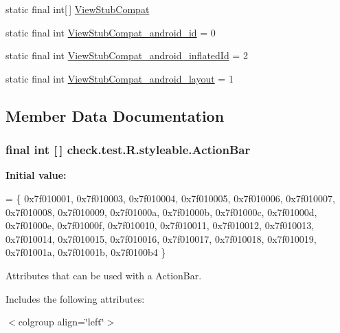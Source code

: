\begin{DoxyCompactItemize}
\item 
static final int\mbox{[}$\,$\mbox{]} \hyperlink{classcheck_1_1test_1_1_r_1_1styleable_adf691a9cd72c9028688f92bcb9b1c303}{View\+Stub\+Compat}
\item 
static final int \hyperlink{classcheck_1_1test_1_1_r_1_1styleable_af549e8eb71e8bfcf674efa7c9f7cd251}{View\+Stub\+Compat\+\_\+android\+\_\+id} = 0
\item 
static final int \hyperlink{classcheck_1_1test_1_1_r_1_1styleable_a7c6502320542baa7a355bd6d9665ff5f}{View\+Stub\+Compat\+\_\+android\+\_\+inflated\+Id} = 2
\item 
static final int \hyperlink{classcheck_1_1test_1_1_r_1_1styleable_ad1bcaf475dc40c26f77157642598f49c}{View\+Stub\+Compat\+\_\+android\+\_\+layout} = 1
\end{DoxyCompactItemize}


\subsection{Member Data Documentation}
\hypertarget{classcheck_1_1test_1_1_r_1_1styleable_ad0a4d403cb244ea4d22c6f6ebf2c2cdf}{}
\subsubsection[{Action\+Bar}]{\setlength{\rightskip}{0pt plus 5cm}final int \mbox{[}$\,$\mbox{]} check.\+test.\+R.\+styleable.\+Action\+Bar\hspace{0.3cm}{\ttfamily [static]}}\label{classcheck_1_1test_1_1_r_1_1styleable_ad0a4d403cb244ea4d22c6f6ebf2c2cdf}
{\bfseries Initial value\+:}
\begin{DoxyCode}
= \{
            0x7f010001, 0x7f010003, 0x7f010004, 0x7f010005,
            0x7f010006, 0x7f010007, 0x7f010008, 0x7f010009,
            0x7f01000a, 0x7f01000b, 0x7f01000c, 0x7f01000d,
            0x7f01000e, 0x7f01000f, 0x7f010010, 0x7f010011,
            0x7f010012, 0x7f010013, 0x7f010014, 0x7f010015,
            0x7f010016, 0x7f010017, 0x7f010018, 0x7f010019,
            0x7f01001a, 0x7f01001b, 0x7f0100b4
        \}
\end{DoxyCode}
Attributes that can be used with a Action\+Bar. 

Includes the following attributes\+:

\begin{TabularC}{0}
\hline
\end{TabularC}
$<$colgroup align=\char`\"{}left\char`\"{}$>$ 


